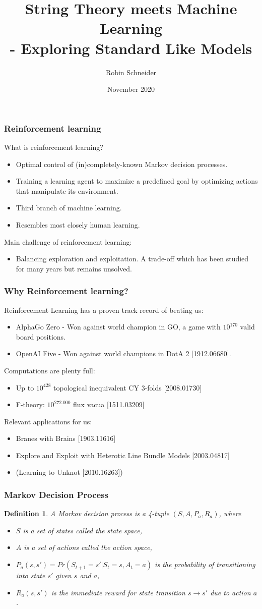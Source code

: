 \documentclass{beamer}
\title[Reinforcement Learning]{String Theory meets Machine Learning\\
	- Exploring Standard Like Models}
\author{Robin Schneider}
\institute{Uppsala University}
\date{November 2020}
\newtheorem{defn}{Definition}
\newcommand{\bi}{\begin{itemize}}
\newcommand{\ei}{\end{itemize}}
\begin{document}
	
\frame{\titlepage}

\begin{frame}
\frametitle{Reinforcement learning}
What is reinforcement learning? \\
\bi
\item Optimal control of (in)completely-known Markov decision processes.
\item Training a learning agent to maximize a predefined goal by optimizing actions that manipulate its environment.
\item Third branch of machine learning.
\item Resembles most closely human learning.
\ei
\pause
Main challenge of reinforcement learning:
\bi
\item Balancing exploration and exploitation. A trade-off which has been studied for many years but remains unsolved.
\ei
\end{frame}

\begin{frame}
\frametitle{Why Reinforcement learning?}
Reinforcement Learning has a proven track record of beating us:
\bi
\item AlphaGo Zero - Won against world champion in GO, a game with $10^{170}$ valid board positions.
\item OpenAI Five - Won against world champions in DotA 2 {\color{blue}[1912.06680]}.
\ei
\pause 
Computations are plenty full:
\bi \item Up to $10^{428}$ topological inequivalent CY 3-folds {\color{blue} [2008.01730]} %
\item F-theory: $10^{272.000}$ flux vacua {\color{blue} [1511.03209]}%
\ei 
\pause
Relevant applications for us:
\bi
\item Branes with Brains {\color{blue} [1903.11616]}
\item Explore and Exploit with Heterotic Line Bundle Models {\color{blue} [2003.04817]}
\item (Learning to Unknot {\color{blue} [2010.16263]})
\ei
\end{frame}


\begin{frame}
\frametitle{Markov Decision Process}
\begin{defn}
	A Markov decision process is a 4-tuple $(S, A, P_a, R_a)$, where
	\begin{itemize}
		\item $S$ is a set of states called the state space,
		\item $A$ is a set of actions called the action space,
		\item $P_a(s,s') = Pr(S_{t+1} = s'| S_t = s, A_t = a)$ is the probability of transitioning into state $s'$ given $s$ and $a$,
		\item $R_a(s,s')$ is the immediate reward for state transition $s \rightarrow s'$ due to action $a$.
	\end{itemize}
\end{defn}
\end{frame}
\end{document}
